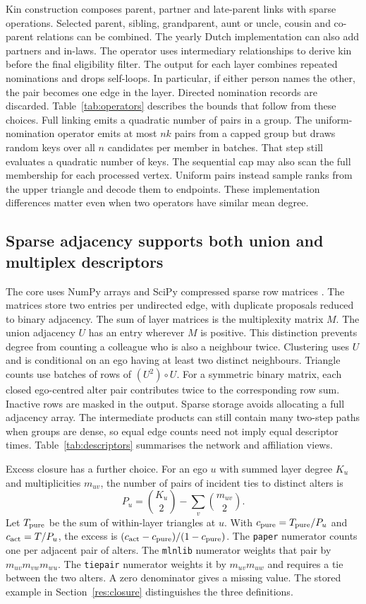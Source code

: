 Kin construction composes parent, partner and late-parent links with sparse operations. Selected parent, sibling, grandparent, aunt or uncle, cousin and co-parent relations can be combined. The yearly Dutch implementation can also add partners and in-laws. The operator uses intermediary relationships to derive kin before the final eligibility filter. The output for each layer combines repeated nominations and drops self-loops. In particular, if either person names the other, the pair becomes one edge in the layer. Directed nomination records are discarded. Table~\ref{tab:operators} describes the bounds that follow from these choices. Full linking emits a quadratic number of pairs in a group. The uniform-nomination operator emits at most $nk$ pairs from a capped group but draws random keys over all $n$ candidates per member in batches. That step still evaluates a quadratic number of keys. The sequential cap may also scan the full membership for each processed vertex. Uniform pairs instead sample ranks from the upper triangle and decode them to endpoints. These implementation differences matter even when two operators have similar mean degree.


\subsection{Sparse adjacency supports both union and multiplex descriptors}

The core uses NumPy arrays and SciPy compressed sparse row matrices \citep{harris2020,virtanen2020}. The matrices store two entries per undirected edge, with duplicate proposals reduced to binary adjacency. The sum of layer matrices is the multiplexity matrix $M$. The union adjacency $U$ has an entry wherever $M$ is positive. This distinction prevents degree from counting a colleague who is also a neighbour twice. Clustering uses $U$ and is conditional on an ego having at least two distinct neighbours. Triangle counts use batches of rows of $(U^2)\circ U$. For a symmetric binary matrix, each closed ego-centred alter pair contributes twice to the corresponding row sum. Inactive rows are masked in the output. Sparse storage avoids allocating a full adjacency array. The intermediate products can still contain many two-step paths when groups are dense, so equal edge counts need not imply equal descriptor times. Table~\ref{tab:descriptors} summarises the network and affiliation views.


Excess closure has a further choice. For an ego $u$ with summed layer degree $K_u$ and multiplicities $m_{uv}$, the number of pairs of incident ties to distinct alters is
\[
 P_u = \binom{K_u}{2}-\sum_v \binom{m_{uv}}{2}.
\]
Let $T_{\rm pure}$ be the sum of within-layer triangles at $u$. With $c_{\rm pure}=T_{\rm pure}/P_u$ and $c_{\rm act}=T/P_u$, the excess is $(c_{\rm act}-c_{\rm pure})/(1-c_{\rm pure})$. The \texttt{paper} numerator counts one per adjacent pair of alters. The \texttt{mlnlib} numerator weights that pair by $m_{uv}m_{vw}m_{wu}$. The \texttt{tiepair} numerator weights it by $m_{uv}m_{uw}$ and requires a tie between the two alters. A zero denominator gives a missing value. The stored example in Section~\ref{res:closure} distinguishes the three definitions.

